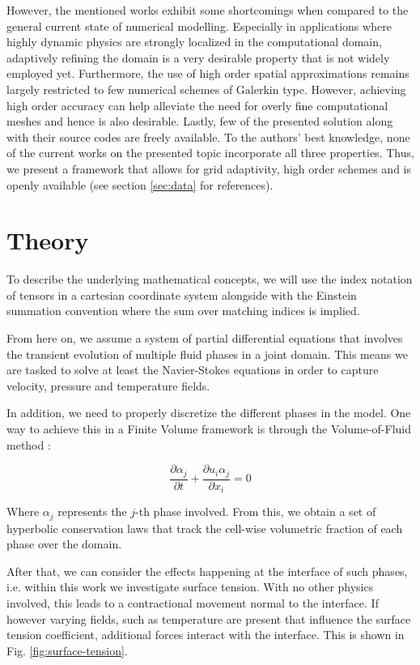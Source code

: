 \documentclass[conference,final,a4paper]{IEEEtran}
\begin{document}
However, the mentioned works exhibit some shortcomings when compared to the general current state of numerical modelling. Especially in applications where highly dynamic physics are strongly localized in the computational domain, adaptively refining the domain is a very desirable property that is not widely employed yet. Furthermore, the use of high order spatial approximations remains largely restricted to few numerical schemes of Galerkin type. However, achieving high order accuracy can help alleviate the need for overly fine computational meshes and hence is also desirable. Lastly, few of the presented solution along with their source codes are freely available. To the authors' best knowledge, none of the current works on the presented topic incorporate all three properties. Thus, we present a framework that allows for grid adaptivity, high order schemes and is openly available (see section \ref{sec:data} for references).

\section{Theory}

To describe the underlying mathematical concepts, we will use the index notation of tensors in a cartesian coordinate system alongside with the Einstein summation convention where the sum over matching indices is implied.

From here on, we assume a system of partial differential equations that involves the transient evolution of multiple fluid phases in a joint domain. This means we are tasked to solve at least the Navier-Stokes equations in order to capture velocity, pressure and temperature fields.

In addition, we need to properly discretize the different phases in the model. One way to achieve this in a Finite Volume framework is through the Volume-of-Fluid method \cite{hirtVolumeFluidVOF1981}:

\begin{equation}
  \frac{\partial \alpha_{j}}{\partial t} + \frac{\partial u_{i} \alpha_{j}}{\partial x_{i}} = 0
\end{equation}

Where $\alpha_{j}$ represents the $j$-th phase involved. From this, we obtain a set of hyperbolic conservation laws that track the cell-wise volumetric fraction of each phase over the domain.

After that, we can consider the effects happening at the interface of such phases, i.e. within this work we investigate surface tension. With no other physics involved, this leads to a contractional movement normal to the interface. If however varying fields, such as temperature are present that influence the surface tension coefficient, additional forces interact with the interface. This is shown in Fig. \ref{fig:surface-tension}.
\end{document}
